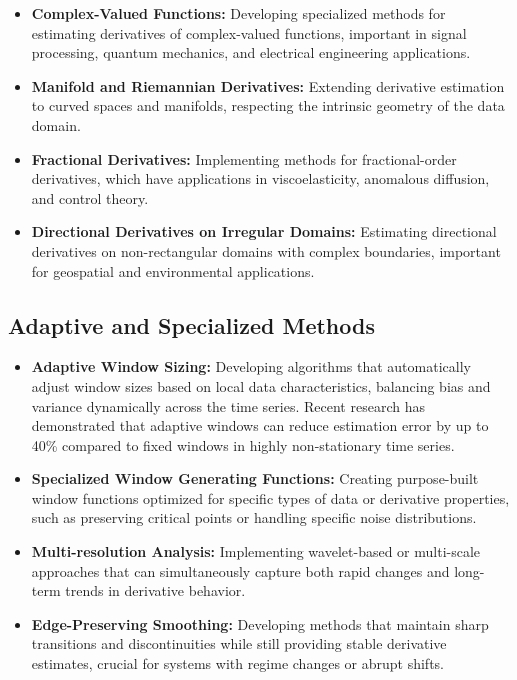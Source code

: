 \documentclass{article}
\begin{document}
\begin{itemize}
    \item \textbf{Complex-Valued Functions:} Developing specialized methods for estimating derivatives of complex-valued functions, important in signal processing, quantum mechanics, and electrical engineering applications.
    
    \item \textbf{Manifold and Riemannian Derivatives:} Extending derivative estimation to curved spaces and manifolds, respecting the intrinsic geometry of the data domain.
    
    \item \textbf{Fractional Derivatives:} Implementing methods for fractional-order derivatives, which have applications in viscoelasticity, anomalous diffusion, and control theory.
    
    \item \textbf{Directional Derivatives on Irregular Domains:} Estimating directional derivatives on non-rectangular domains with complex boundaries, important for geospatial and environmental applications.
\end{itemize}

\subsection{Adaptive and Specialized Methods}

\begin{itemize}
    \item \textbf{Adaptive Window Sizing:} Developing algorithms that automatically adjust window sizes based on local data characteristics, balancing bias and variance dynamically across the time series. Recent research has demonstrated that adaptive windows can reduce estimation error by up to 40\% compared to fixed windows in highly non-stationary time series.
    
    \item \textbf{Specialized Window Generating Functions:} Creating purpose-built window functions optimized for specific types of data or derivative properties, such as preserving critical points or handling specific noise distributions.
    
    \item \textbf{Multi-resolution Analysis:} Implementing wavelet-based or multi-scale approaches that can simultaneously capture both rapid changes and long-term trends in derivative behavior.
    
    \item \textbf{Edge-Preserving Smoothing:} Developing methods that maintain sharp transitions and discontinuities while still providing stable derivative estimates, crucial for systems with regime changes or abrupt shifts.
\end{itemize}
\end{document}
